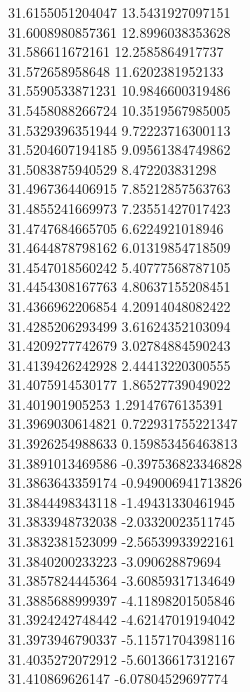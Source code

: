 {31.6155051204047	13.5431927097151\\
31.6008980857361	12.8996038353628\\
31.586611672161	12.2585864917737\\
31.572658958648	11.6202381952133\\
31.5590533871231	10.9846600319486\\
31.5458088266724	10.3519567985005\\
31.5329396351944	9.72223716300113\\
31.5204607194185	9.09561384749862\\
31.5083875940529	8.472203831298\\
31.4967364406915	7.85212857563763\\
31.4855241669973	7.23551427017423\\
31.4747684665705	6.6224921018946\\
31.4644878798162	6.01319854718509\\
31.4547018560242	5.40777568787105\\
31.4454308167763	4.80637155208451\\
31.4366962206854	4.20914048082422\\
31.4285206293499	3.61624352103094\\
31.4209277742679	3.02784884590243\\
31.4139426242928	2.44413220300555\\
31.4075914530177	1.86527739049022\\
31.401901905253	1.29147676135391\\
31.3969030614821	0.722931755221347\\
31.3926254988633	0.159853456463813\\
31.3891013469586	-0.397536823346828\\
31.3863643359174	-0.949006941713826\\
31.3844498343118	-1.49431330461945\\
31.3833948732038	-2.03320023511745\\
31.3832381523099	-2.56539933922161\\
31.3840200233223	-3.090628879694\\
31.3857824445364	-3.60859317134649\\
31.3885688999397	-4.11898201505846\\
31.3924242748442	-4.62147019194042\\
31.3973946790337	-5.11571704398116\\
31.4035272072912	-5.60136617312167\\
31.410869626147	-6.07804529697774\\
}
